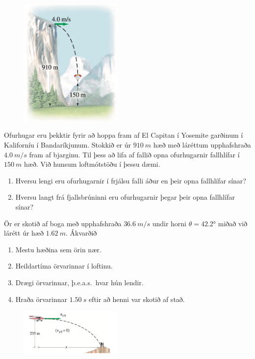 \ifdefined \wholebook \else\documentclass[oneside]{book}\usepackage{EdlBook}\graphicspath{{figures/}}
\begin{document}
\begin{enumerate}[label = \textbf{Dæmi \thechapter.\arabic*.}]
\begin{minipage}{\linewidth}
\begin{figure}
\vspace{-1.4cm}
\includegraphics[width=2in]{images/hoppa.png}

\end{figure}

\item Ofurhugar eru þekktir fyrir að hoppa fram af El Capitan í Yosemite garðinum í Kaliforníu í Bandaríkjunum. Stokkið er úr $\SI{910}{m}$ hæð með láréttum upphafshraða $\SI{4.0}{m/s}$ fram af bjarginu. Til þess að lifa af fallið opna ofurhugarnir fallhlífar í $\SI{150}{m}$ hæð. Við hunsum loftmótstöðu í þessu dæmi.

\begin{enumerate}[label = \textbf{(\alph*)}]
    \item Hversu lengi eru ofurhugarnir í frjálsu falli áður en þeir opna fallhlífar sínar?
    \item Hversu langt frá fjallsbrúninni eru ofurhugarnir þegar þeir opna fallhlífar sínar?
\end{enumerate}

\item Ör er skotið af boga með upphafshraða $\SI{36.6}{m/s}$ undir horni $\theta = \ang{42.2}$ miðað við lárétt úr hæð $\SI{1.62}{m}$. Ákvarðið
\begin{enumerate}[label = \textbf{(\alph*)}]
    \item Mestu hæðina sem örin nær.
    \item Heildartíma örvarinnar í loftinu.
    \item Drægi örvarinnar, þ.e.a.s.~hvar hún lendir.
    \item Hraða örvarinnar $\SI{1.50}{s}$ eftir að henni var skotið af stað.
\end{enumerate}

\end{minipage}

\begin{minipage}{\linewidth}
\begin{figure}
\vspace{-3.75cm}
\includegraphics[width=2in]{images/flug.png}
\end{figure}


\end{minipage}
\end{enumerate}
\end{document}
